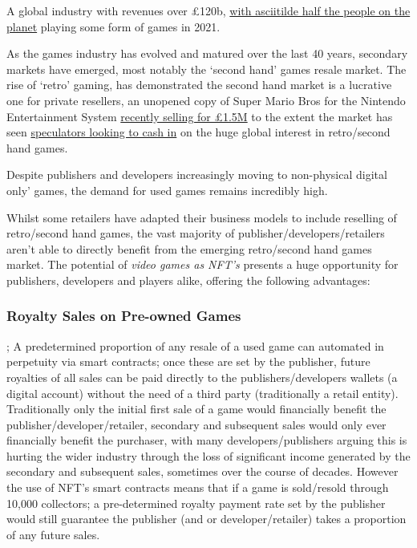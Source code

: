 A global industry with revenues over £120b,
\href{https://www.wepc.com/news/video-game-statistics/}{with
asciitilde half the people on the planet} playing some form of
games in 2021.

As the games industry has evolved and matured over the last 40 years,
secondary markets have emerged, most notably the `second hand' games
resale market. The rise of `retro' gaming, has demonstrated the second
hand market is a lucrative one for private resellers, an unopened copy
of Super Mario Bros for the Nintendo Entertainment System
\href{https://www.nytimes.com/2021/08/06/business/super-mario-bros-sale-record.html}{recently
selling for £1.5M} to the extent the market has seen
\href{https://www.businessinsider.com/retro-gaming-market-being-overtaken-by-speculators-2021-9?r=US\&IR=T}{speculators
looking to cash in} on the huge global interest in retro/second hand
games.\par
Despite publishers and developers increasingly moving to non-physical
digital only' games, the demand for used games remains incredibly high.\par
Whilst some retailers have adapted their business models to include reselling of retro/second hand games, the vast majority of publisher/developers/retailers aren't able to directly benefit from the
emerging retro/second hand games market. The potential of \emph{video
games as NFT's} presents a huge opportunity for publishers, developers
and players alike, offering the following advantages:
\subsubsection{Royalty Sales on Pre-owned Games} ; A predetermined proportion
  of any resale of a used game can automated in perpetuity via smart
  contracts; once these are set by the publisher, future royalties of
  all sales can be paid directly to the publishers/developers wallets (a
  digital account) without the need of a third party (traditionally a
  retail entity). Traditionally only the initial first sale of a game
  would financially benefit the publisher/developer/retailer, secondary
  and subsequent sales would only ever financially benefit the
  purchaser, with many developers/publishers arguing this is hurting the
  wider industry through the loss of significant income generated by the
  secondary and subsequent sales, sometimes over the course of decades.
  However the use of NFT's smart contracts means that if a game is
  sold/resold through 10,000 collectors; a pre-determined royalty
  payment rate set by the publisher would still guarantee the publisher
  (and or developer/retailer) takes a proportion of any future sales.
